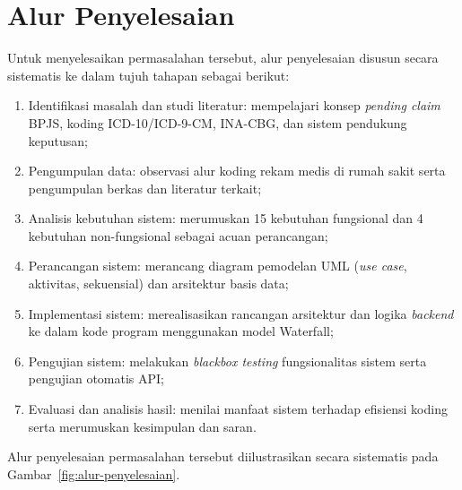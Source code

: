 \section{Alur Penyelesaian}
Untuk menyelesaikan permasalahan tersebut, alur penyelesaian disusun secara sistematis ke dalam tujuh tahapan sebagai berikut:
\begin{enumerate}
  \item Identifikasi masalah dan studi literatur: mempelajari konsep \textit{pending claim} BPJS, koding ICD-10/ICD-9-CM, INA-CBG, dan sistem pendukung keputusan;
  \item Pengumpulan data: observasi alur koding rekam medis di rumah sakit serta pengumpulan berkas dan literatur terkait;
  \item Analisis kebutuhan sistem: merumuskan 15 kebutuhan fungsional dan 4 kebutuhan non-fungsional sebagai acuan perancangan;
  \item Perancangan sistem: merancang diagram pemodelan UML (\textit{use case}, aktivitas, sekuensial) dan arsitektur basis data;
  \item Implementasi sistem: merealisasikan rancangan arsitektur dan logika \textit{backend} ke dalam kode program menggunakan model Waterfall;
  \item Pengujian sistem: melakukan \textit{blackbox testing} fungsionalitas sistem serta pengujian otomatis API;
  \item Evaluasi dan analisis hasil: menilai manfaat sistem terhadap efisiensi koding serta merumuskan kesimpulan dan saran.
\end{enumerate}

Alur penyelesaian permasalahan tersebut diilustrasikan secara sistematis pada Gambar~\ref{fig:alur-penyelesaian}.

